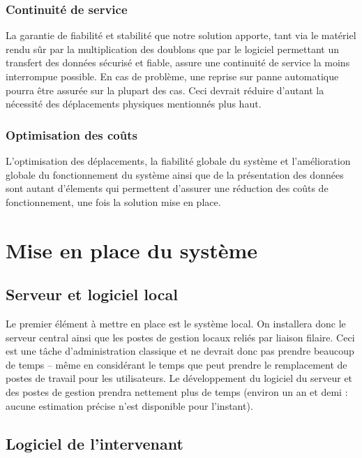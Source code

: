 \documentclass[a4paper, 11pt, draft]{article}
\begin{document}
\subsubsection{Continuité de service}

La garantie de fiabilité et stabilité que notre solution apporte, tant via le matériel rendu sûr par la multiplication des doublons que par le logiciel permettant un transfert des données sécurisé et fiable, assure une continuité de service la moins interrompue possible. En cas de problème, une reprise sur panne automatique pourra être assurée sur la plupart des cas. Ceci devrait réduire d'autant la nécessité des déplacements physiques mentionnés plus haut.

\subsubsection{Optimisation des coûts}

L'optimisation des déplacements, la fiabilité globale du système et l'amélioration globale du fonctionnement du système ainsi que de la présentation des données sont autant d'élements qui permettent d'assurer une réduction des coûts de fonctionnement, une fois la solution mise en place.

\section{Mise en place du système}

\subsection{Serveur et logiciel local}

Le premier élément à mettre en place est le système local. On installera donc le serveur central ainsi que les postes de gestion locaux reliés par liaison filaire. Ceci est une tâche d'administration classique et ne devrait donc pas prendre beaucoup de temps -- même en considérant le temps que peut prendre le remplacement de postes de travail pour les utilisateurs. Le développement du logiciel du serveur et des postes de gestion prendra nettement plus de temps (environ un an et demi : aucune estimation précise n'est disponible pour l'instant).

\subsection{Logiciel de l'intervenant}
\end{document}
